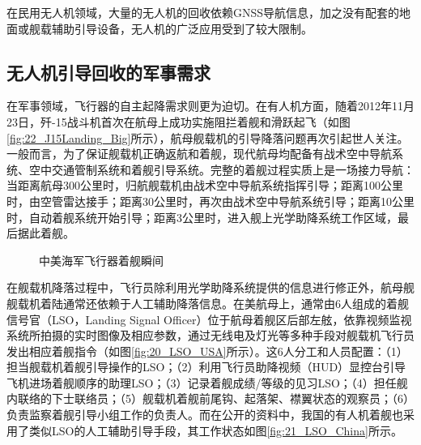 在民用无人机领域，大量的无人机的回收依赖GNSS导航信息，加之没有配套的地面或舰载辅助引导设备，无人机的广泛应用受到了较大限制。

\subsection{无人机引导回收的军事需求}
在军事领域，飞行器的自主起降需求则更为迫切。在有人机方面，随着2012年11月23日，歼-15战斗机首次在航母上成功实施阻拦着舰和滑跃起飞（如图\ref{fig:22_J15Landing_Big}所示），航母舰载机的引导降落问题再次引起世人关注。一般而言，为了保证舰载机正确返航和着舰，现代航母均配备有战术空中导航系统、空中交通管制系统和着舰引导系统。完整的着舰过程实质上是一场接力导航：当距离航母300公里时，归航舰载机由战术空中导航系统指挥引导；距离100公里时，由空管雷达接手；距离30公里时，再次由战术空中导航系统引导；距离10公里时，自动着舰系统开始引导；距离3公里时，进入舰上光学助降系统工作区域，最后据此着舰。

\begin{figure}[htb]
	\centering%
	\hspace{0.7em}%
	\caption{中美海军飞行器着舰瞬间}
	\label{fig:01_Landing}
\end{figure}

在舰载机降落过程中，飞行员除利用光学助降系统提供的信息进行修正外，航母舰舰载机着陆通常还依赖于人工辅助降落信息。在美航母上，通常由6人组成的着舰信号官（LSO，Landing Signal Officer）位于航母着舰区后部左舷，依靠视频监视系统所拍摄的实时图像及相应参数，通过无线电及灯光等多种手段对舰载机飞行员发出相应着舰指令（如图\ref{fig:20_LSO_USA}所示）。这6人分工和人员配置：（1）担当舰载机着舰引导操作的LSO；（2）利用飞行员助降视频（HUD）显控台引导飞机进场着舰顺序的助理LSO；（3）记录着舰成绩/等级的见习LSO；（4）担任舰内联络的下士联络员；（5）舰载机着舰前尾钩、起落架、襟翼状态的观察员；（6）负责监察着舰引导小组工作的负责人。而在公开的资料中，我国的有人机着舰也采用了类似LSO的人工辅助引导手段，其工作状态如图\ref{fig:21_LSO_China}所示。


